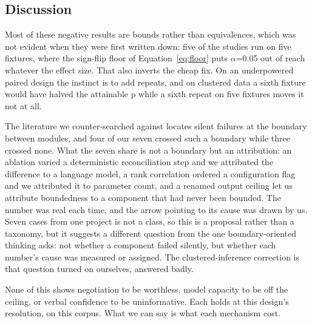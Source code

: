 \subsection{Discussion}
\label{sec:discussion}

Most of these negative results are bounds rather than equivalences, which was not evident when they
were first written down: five of the studies run on five fixtures, where the sign-flip floor of
Equation~\eqref{eq:floor} puts $\alpha$=0.05 out of reach whatever the effect size. That also
inverts the cheap fix. On an underpowered paired design the instinct is to add repeats, and on
clustered data a sixth fixture would have halved the attainable p while a sixth repeat on five
fixtures moves it not at all.

The literature we counter-searched against locates silent failures at the boundary between modules,
and four of our seven crossed such a boundary while three crossed none. What the seven share is not
a boundary but an attribution: an ablation varied a deterministic reconciliation step and we
attributed the difference to a language model, a rank correlation ordered a configuration flag and
we attributed it to parameter count, and a renamed output ceiling let us attribute boundedness to a
component that had never been bounded. The number was real each time, and the arrow pointing to its
cause was drawn by us. Seven cases from one project is not a class, so this is a proposal rather
than a taxonomy, but it suggests a different question from the one boundary-oriented thinking asks:
not whether a component failed silently, but whether each number's cause was measured or assigned.
The clustered-inference correction is that question turned on ourselves, answered badly.

None of this shows negotiation to be worthless, model capacity to be off the ceiling, or verbal
confidence to be uninformative. Each holds at this design's resolution, on this corpus. What we can
say is what each mechanism cost.
